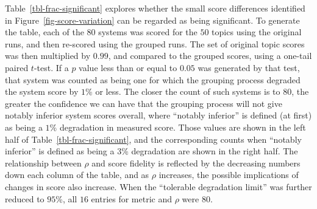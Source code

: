 
Table~\ref{tbl-frac-significant} explores whether the small score
differences identified in Figure~\ref{fig-score-variation} can be
regarded as being significant.
To generate the table, each of the $80$ systems was scored for the
$50$ topics using the original runs, and then re-scored using the
grouped runs.
The set of original topic scores was then multiplied by $0.99$, and
compared to the grouped scores, using a one-tail paired $t$-test.
If a $p$ value less than or equal to $0.05$ was generated by that
test, that system was counted as being one for which the grouping
process degraded the system score by $1$\% or less.
The closer the count of such systems is to $80$, the greater the
confidence we can have that the grouping process will not give
notably inferior system scores overall, where ``notably inferior'' is
defined (at first) as being a $1$\% degradation in measured score.
Those values are shown in the left half of
Table~\ref{tbl-frac-significant}, and the corresponding counts when
``notably inferior'' is defined as being a $3$\% degradation are
shown in the right half.
The relationship between $\rho$ and score fidelity is
reflected by the decreasing numbers down each column of the table,
and as $\rho$ increases, the possible implications of changes in
score also increase.
When the ``tolerable degradation limit'' was further reduced to
$95$\%, all $16$ entries for metric and $\rho$ were $80$.

